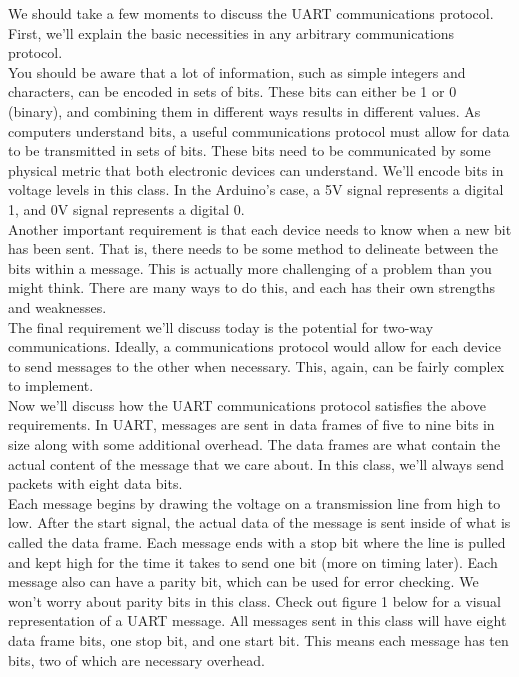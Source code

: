 \documentclass[12pt]{article}
\begin{document}
	We should take a few moments to discuss the UART communications protocol. First, we'll explain the basic necessities in any arbitrary communications protocol. \\
	
	You should be aware that a lot of information, such as simple integers and characters, can be encoded in sets of bits. These bits can either be 1 or 0 (binary), and combining them in different ways results in different values. As computers understand bits, a useful communications protocol must allow for data to be transmitted in sets of bits. These bits need to be communicated by some physical metric that both electronic devices can understand. We'll encode bits in voltage levels in this class. In the Arduino's case, a 5V signal represents a digital 1, and 0V signal represents a digital 0.\\
	
	Another important requirement is that each device needs to know when a new bit has been sent. That is, there needs to be some method to delineate between the bits within a message. This is actually more challenging of a problem than you might think. There are many ways to do this, and each has their own strengths and weaknesses.\\
	
	The final requirement we'll discuss today is the potential for two-way communications. Ideally, a communications protocol would allow for each device to send messages to the other when necessary. This, again, can be fairly complex to implement. \\
	
	Now we'll discuss how the UART communications protocol satisfies the above requirements. In UART, messages are sent in data frames of five to nine bits in size along with some additional overhead. The data frames are what contain the actual content of the message that we care about. In this class, we'll always send packets with eight data bits. \\
	
	Each message begins by drawing the voltage on a transmission line from high to low. After the start signal, the actual data of the message is sent inside of what is called the data frame. Each message ends with a stop bit where the line is pulled and kept high for the time it takes to send one bit (more on timing later). Each message also can have a parity bit, which can be used for error checking. We won't worry about parity bits in this class. Check out figure 1 below for a visual representation of a UART message. All messages sent in this class will have eight data frame bits, one stop bit, and one start bit. This means each message has ten bits, two of which are necessary overhead.
\end{document}
